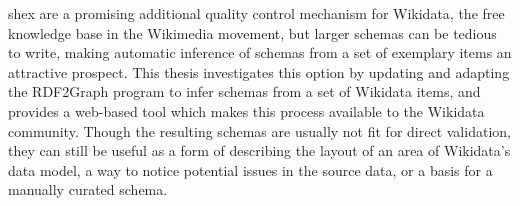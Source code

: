 
\Abstract
\acrlong{shex} are a promising additional quality control mechanism for \gls{Wikidata},
the free knowledge base in the \gls{Wikimedia} movement,
but larger \glspl{schema} can be tedious to write,
making automatic inference of \glspl{schema} from a set of exemplary \glspl{item} an attractive prospect. %
This thesis investigates %
this option by updating and adapting the RDF2Graph program to infer \glspl{schema} from a set of \gls{Wikidata} \glspl{item},
and provides a web-based tool which makes this process available to the \gls{Wikidata} community.
Though the resulting \glspl{schema} are usually not fit for direct validation,
they can still be useful as a form of describing the layout of an area of \gls{Wikidata}’s data model,
a way to notice potential issues in the source data,
or a basis for a manually curated \gls{schema}.
